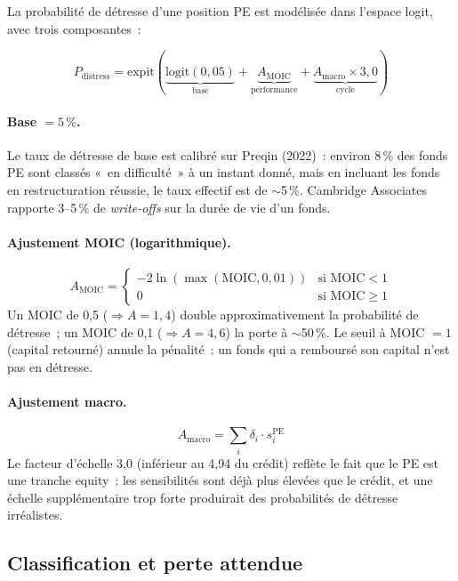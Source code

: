 \documentclass[12pt, a4paper, twoside, openright]{report}
\theoremstyle{definition}
\begin{document}
La probabilité de détresse d'une position PE est modélisée dans l'espace logit, avec trois composantes~:

\begin{equation}
P_{\text{distress}} = \text{expit}\!\left(\underbrace{\text{logit}(0{,}05)}_{\text{base}} + \underbrace{A_{\text{MOIC}}}_{\text{performance}} + \underbrace{A_{\text{macro}} \times 3{,}0}_{\text{cycle}}\right)
\label{eq:p-distress}
\end{equation}

\paragraph{Base $= 5\,\%$.} Le taux de détresse de base est calibré sur Preqin (2022)~: environ 8\,\% des fonds PE sont classés «~en difficulté~» à un instant donné, mais en incluant les fonds en restructuration réussie, le taux effectif est de $\sim$5\,\%. Cambridge Associates rapporte 3--5\,\% de \emph{write-offs} sur la durée de vie d'un fonds.

\paragraph{Ajustement MOIC (logarithmique).}
$$A_{\text{MOIC}} = \begin{cases} -2 \ln(\max(\text{MOIC}, 0{,}01)) & \text{si MOIC} < 1 \\ 0 & \text{si MOIC} \geq 1 \end{cases}$$
Un MOIC de 0{,}5 ($\Rightarrow A = 1{,}4$) double approximativement la probabilité de détresse~; un MOIC de 0{,}1 ($\Rightarrow A = 4{,}6$) la porte à $\sim$50\,\%. Le seuil à MOIC $= 1$ (capital retourné) annule la pénalité~: un fonds qui a remboursé son capital n'est pas en détresse.

\paragraph{Ajustement macro.}
$$A_{\text{macro}} = \sum_i \delta_i \cdot s^{\text{PE}}_i$$
Le facteur d'échelle 3{,}0 (inférieur au 4{,}94 du crédit) reflète le fait que le PE est une tranche equity~: les sensibilités sont déjà plus élevées que le crédit, et une échelle supplémentaire trop forte produirait des probabilités de détresse irréalistes.

\subsection{Classification et perte attendue}
\end{document}
